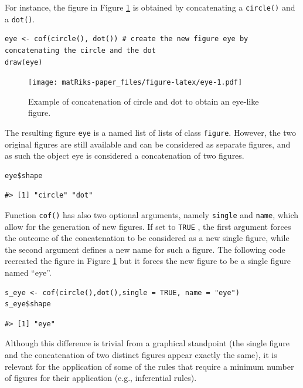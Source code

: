 For instance, the figure in Figure \ref{fig:eye} is obtained by concatenating a \texttt{circle()} and a \texttt{dot()}.

\begin{verbatim}
eye <- cof(circle(), dot()) # create the new figure eye by concatenating the circle and the dot
draw(eye)
\end{verbatim}

\begin{figure}
\centering
\texttt{[image: matRiks-paper\_files/figure-latex/eye-1.pdf]}
\caption{\label{fig:eye}Example of concatenation of circle and dot to obtain an eye-like figure.}
\end{figure}

The resulting figure \texttt{eye} is a named list of lists of class \texttt{figure}. However, the two original figures are still available and can be considered as separate figures, and as such the object eye is considered a concatenation of two figures.

\begin{verbatim}
eye$shape
\end{verbatim}

\begin{verbatim}
#> [1] "circle" "dot"
\end{verbatim}

Function \texttt{cof()} has also two optional arguments, namely \texttt{single} and \texttt{name}, which allow for the generation of new figures. If set to \texttt{TRUE} ,
the first argument forces the outcome of the concatenation to be considered as a new single figure, while the second argument defines a new name for such a figure.
The following code recreated the figure in Figure \ref{fig:eye} but it forces the new figure to be a single figure named ``eye''.

\begin{verbatim}
s_eye <- cof(circle(),dot(),single = TRUE, name = "eye")
s_eye$shape
\end{verbatim}

\begin{verbatim}
#> [1] "eye"
\end{verbatim}

Although this difference is trivial from a graphical standpoint (the single figure and the concatenation of two distinct figures appear exactly the same), it is relevant for the application of some of the rules that require a minimum number of figures for their application (e.g., inferential rules).

